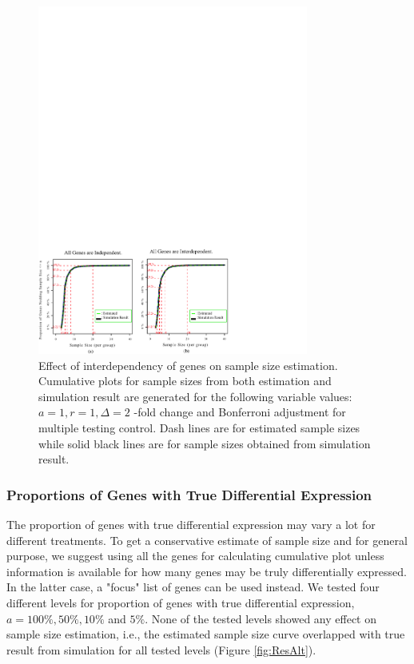 \documentclass{bioinfo}
\begin{document}
\begin{figure}[h]
  \centerline{\includegraphics*[width=3.5in]{ResDepF.pdf}}
  \caption[Effect of interdependency of genes on sample size estimation]
  {Effect of interdependency of genes on sample size estimation.
    Cumulative plots for sample sizes from both estimation and simulation result
    are generated for the following variable values: $a = 1, r = 1, \Delta = 2$ -fold change
    and Bonferroni adjustment for multiple testing control. Dash lines are for estimated sample sizes
    while solid black lines are for sample sizes obtained from simulation result.}
  \label{fig:ResDep}
\end{figure}

\subsubsection{Proportions of Genes with True Differential Expression}
The proportion of genes with true differential expression may vary
a lot for different treatments. To get a conservative estimate of
sample size and for general purpose, we suggest using all the
genes for calculating cumulative plot unless information is
available for how many genes may be truly differentially
expressed. In the latter case, a "focus" list of genes can be used
instead. We tested four different levels for proportion of genes
with true differential expression, $a = 100\%, 50\%, 10\%$ and
$5\%$. None of the tested levels showed any effect on sample size
estimation, i.e., the estimated sample size curve overlapped with
true result from simulation for all tested levels (Figure
\ref{fig:ResAlt}).
\end{document}
